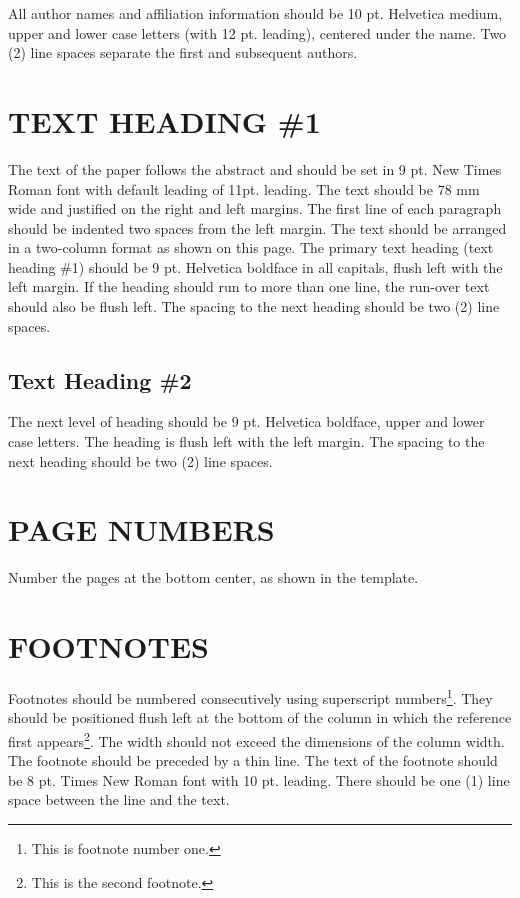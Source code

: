 \documentclass[twocolumn,10pt]{hphrc}
\begin{document}
All author names and affiliation information should be 10 pt. Helvetica medium, upper and lower case letters (with 12 pt. leading), centered under the name. Two (2) line spaces separate the first and subsequent authors.

\section*{TEXT HEADING \#1}

The text of the paper follows the abstract and should be set in 9 pt. New Times Roman font with default leading of 11pt. leading. The text should be 78 mm wide and justified on the right and left margins. The first line of each paragraph should be indented two spaces from the left margin. The text should be arranged in a two-column format as shown on this page. The primary text heading (text heading \#1) should be 9 pt. Helvetica boldface in all capitals, flush left with the left margin. If the heading should run to more than one line, the run-over text should also be flush left. The spacing to the next heading should be two (2) line spaces.

\subsection*{Text Heading \#2}

The next level of heading should be 9 pt. Helvetica boldface, upper and lower case letters. The heading is flush left with the left margin. The spacing to the next heading should be two (2) line spaces.

\section*{PAGE NUMBERS}

Number the pages at the bottom center, as shown in the template.

\section*{FOOTNOTES}

Footnotes should be numbered consecutively using superscript numbers\footnote{This is footnote number one.}. They should be positioned flush left at the bottom of the column in which the reference first appears\footnote{This is the second footnote.}. The width should not exceed the dimensions of the column width. The footnote should be preceded by a thin line. The text of the footnote should be 8 pt. Times New Roman font with 10 pt. leading. There should be one (1) line space between the line and the text.
\end{document}

